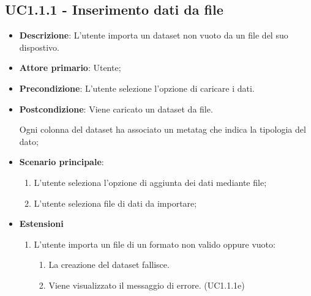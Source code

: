\subsection{UC1.1.1 - Inserimento dati da file}
\begin{itemize}
    \item \textbf{Descrizione}: L'utente importa un dataset non vuoto da un file del suo dispostivo.

    \item \textbf{Attore primario}: Utente;
    
    \item \textbf{Precondizione}:   L'utente selezione l'opzione di caricare i dati.

    \item \textbf{Postcondizione}:  Viene caricato un dataset da file. 

                                    Ogni colonna del dataset ha associato
                                    un metatag che indica la tipologia del dato;

	\item \textbf{Scenario principale}:
		\begin{enumerate}
			\item L'utente seleziona l'opzione di aggiunta dei dati mediante file;
			\item L'utente seleziona file di dati da importare;
        \end{enumerate}

    \item \textbf{Estensioni}
    \begin{enumerate}
  
    \item L'utente importa un file di un formato non valido oppure vuoto:
        \begin{enumerate}
            \item La creazione del dataset fallisce.
            \item Viene visualizzato il messaggio di errore. (UC1.1.1e)
        \end{enumerate}
    \end{enumerate}
\end{itemize}

